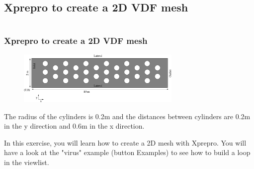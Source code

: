 \documentclass[10pt]{beamer}
\begin{document}
\subsection{Xprepro to create a 2D VDF mesh}
\begin{frame}
\begin{columns}[c] 
\tableofcontents[sections={1-6},currentsection, currentsubsection]
\tableofcontents[sections={7-12},currentsection, currentsubsection]
\end{columns}
\end{frame}
\begin{frame}
\frametitle{Xprepro to create a 2D VDF mesh}
\begin{block}{}

\begin{figure}
\includegraphics[width=0.7\textwidth]{PICTURES/xprepro.pdf}
\end{figure}

The radius of the cylinders is 0.2m and the distances between cylinders are 0.2m in the y direction and 0.6m in the x direction. \\
\vspace{0.2cm}

In this exercise, you will learn how to create a 2D mesh with Xprepro. You will have a look at the "virus" example (button Examples) to see how to build a loop in the viewlist.

\end{block}
\end{frame}
\end{document}
